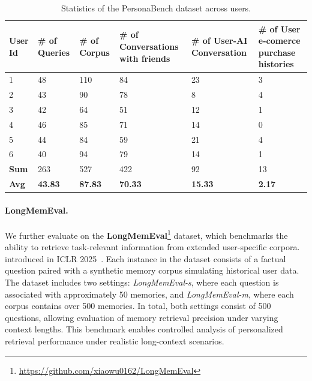 \begin{table}[htbp]
    \centering
    \caption{Statistics of the PersonaBench dataset across users.}

    \label{tab:personabench_stats}
    \begin{tabular}{M{1cm}M{1cm}M{1.3cm}M{3cm}M{2cm}M{3cm}}
    \toprule
    \textbf{User Id} & \textbf{\# of Queries} & \textbf{\# of Corpus} & \textbf{\# of Conversations with friends} & \textbf{\# of User-AI Conversation} & \textbf{\# of User e-comerce purchase histories} \\
     & 48 & 110 & 84 & 23 & 3 \\
    2 & 43 & 90  & 78 & 8  & 4 \\
    3 & 42 & 64  & 51 & 12 & 1 \\
    4 & 46 & 85  & 71 & 14 & 0 \\
    5 & 44 & 84  & 59 & 21 & 4 \\
    6 & 40 & 94  & 79 & 14 & 1 \\
    \midrule
    \textbf{Sum} & 263 & 527 & 422 & 92 & 13 \\
    \textbf{Avg} & \textbf{43.83} & \textbf{87.83} & \textbf{70.33} & \textbf{15.33} & \textbf{2.17} \\
    \bottomrule
    \end{tabular}
\vspace{-10pt}
\end{table}


\paragraph{LongMemEval.}
We further evaluate on the \textbf{LongMemEval}\footnote{\url{https://github.com/xiaowu0162/LongMemEval}} dataset, which benchmarks the ability to retrieve task-relevant information from extended user-specific corpora. introduced in ICLR 2025~\citep{wu2024longmemeval}. 
Each instance in the dataset consists of a factual question paired with a synthetic memory corpus simulating historical user data. The dataset includes two settings: \textit{LongMemEval-s}, where each question is associated with approximately 50 memories, and \textit{LongMemEval-m}, where each corpus contains over 500 memories. In total, both settings consist of 500 questions, allowing evaluation of memory retrieval precision under varying context lengths. This benchmark enables controlled analysis of personalized retrieval performance under realistic long-context scenarios.

